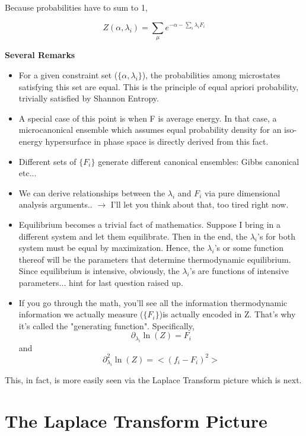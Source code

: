 \documentclass[12pt]{article}
\begin{document}
Because probabilities have to sum to 1, 

$$Z(\alpha, \lambda_i) = \sum_{\mu} e^{- \alpha - \sum_i \lambda_i F_i}$$

{\bf Several Remarks}

\begin{itemize}
\item For a given constraint set ($\{\alpha, \lambda_i \}$), the probabilities among microstates satisfying this set are equal.  This is the principle of equal apriori probability, trivially satisfied by Shannon Entropy. 

\item  A special case of this point is when F is average energy.  In that case, a microcanonical ensemble which assumes equal probability density for an iso-energy hypersurface in phase space is directly derived from this fact.

\item  Different sets of $\{F_i \}$ generate different canonical ensembles: Gibbs canonical etc...

\item We can derive relationships between the $\lambda_i$ and $F_i$ via pure dimensional analysis arguments.. $\rightarrow$ I'll let you think about that, too tired right now.

\item Equilibrium becomes a trivial fact of mathematics.  Suppose I bring in a different system and let them equilibrate.  Then in the end, the $\lambda_i$'s for both system must be equal by maximization.  Hence, the $\lambda_i$'s or some function thereof will be the parameters that determine thermodynamic equilibrium.  Since equilibrium is intensive, obviously, the $\lambda_i$'s are functions of intensive parameters... hint for last question raised up.

\item  If you go through the math, you'll see all the information thermodynamic information we actually measure ($\{F_i \}$)is actually encoded in Z.  That's why it's called the "generating function".  Specifically,
$$\partial_{\lambda_i} \ln(Z) = F_i$$
and 
$$\partial_{\lambda_i}^2 \ln(Z)= <(f_i-F_i)^2>$$

\end{itemize}


This, in fact, is more easily seen via the Laplace Transform picture which is next.

\section{The Laplace Transform Picture}
\end{document}

